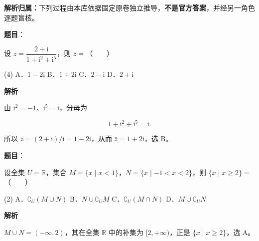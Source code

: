
\begin{gknotice}
\textbf{解析归属：}下列过程由本库依据固定原卷独立推导，\textbf{不是官方答案}，并经另一角色逐题盲核。
\end{gknotice}


\begin{answer}

\textbf{题目}：

设 $z=\dfrac{2+\mathrm i}{1+\mathrm i^2+\mathrm i^5}$，则 $\overline z=$\mbox{（　　）}

\begin{gkopts}(4)
\task A．$1-2\mathrm i$
\task B．$1+2\mathrm i$
\task C．$2-\mathrm i$
\task D．$2+\mathrm i$
\end{gkopts}

\textbf{解析}

由 $\mathrm i^2=-1$、$\mathrm i^5=\mathrm i$，分母为

\nopagebreak[4]
\[
1+\mathrm i^2+\mathrm i^5=\mathrm i.
\]

所以 $z=(2+\mathrm i)/\mathrm i=1-2\mathrm i$，从而 $\bar z=1+2\mathrm i$，选 B。


\end{answer}
\begin{answer}

\textbf{题目}：

设全集 $U=\mathbb R$，集合 $M=\{x\mid x<1\}$，$N=\{x\mid -1<x<2\}$，则 $\{x\mid x\geqslant2\}=$\mbox{（　　）}

\begin{gkopts}(2)
\task A．$\complement_U(M\cup N)$
\task B．$N\cup\complement_U M$
\task C．$\complement_U(M\cap N)$
\task D．$M\cup\complement_U N$
\end{gkopts}

\textbf{解析}

$M\cup N=(-\infty,2)$，其在全集 $\mathbb R$ 中的补集为 $[2,+\infty)$，正是 $\{x\mid x\geqslant2\}$，选 A。


\end{answer}
